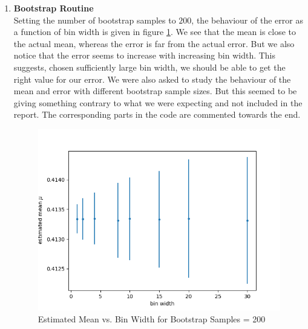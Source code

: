 \documentclass{article}
\begin{document}
\begin{enumerate}
\clearpage
\item \textbf{Bootstrap Routine}\\
Setting the number of bootstrap samples to $200$, the behaviour of the error as a function of bin width is given in figure \ref{fig:meanbin}. We see that the mean is close to the actual mean, whereas the error is far from the actual error. But we also notice that the error seems to increase with increasing bin width. This suggests, chosen sufficiently large bin width, we should be able to get the right value for our error. We were also asked to study the behaviour of the mean and error with different bootstrap sample sizes. But this seemed to be giving something contrary to what we were expecting and not included in the report. The corresponding parts in the code are commented towards the end.

\begin{figure}[h!]
    \centering
    \includegraphics[width=.8\linewidth]{estimated_mean_error.png}
    \caption{Estimated Mean vs. Bin Width for Bootstrap Samples = 200}
    \label{fig:meanbin}
\end{figure}

\end{enumerate}
\end{document}
